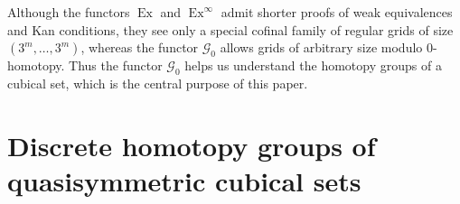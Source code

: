 \documentclass[oneside, 12pt]{amsart}
\numberwithin{equation}{section}
\theoremstyle{plain}
\theoremstyle{definition}
\theoremstyle{remark}
\newtheorem{remark}[theorem]{Remark}
\newcommand{\ex}{\operatorname{Ex}}
\begin{document}
	
	
	
	Although the functors \(\ex\) and \(\ex^\infty\) admit shorter proofs of weak equivalences and Kan conditions, they see only a special cofinal family of regular grids of size $(3^m,\ldots,3^m)$, whereas the functor $\mathcal{G}_0$ allows grids of arbitrary size modulo 0-homotopy. Thus the functor $\mathcal{G}_0$ helps us understand the homotopy groups of a cubical set, which is the central purpose of this paper.
	
	\section{Discrete homotopy groups of quasisymmetric cubical sets}\label{Discrete homotopy groups of quasisymmetric cubical sets}
	
\end{document}

